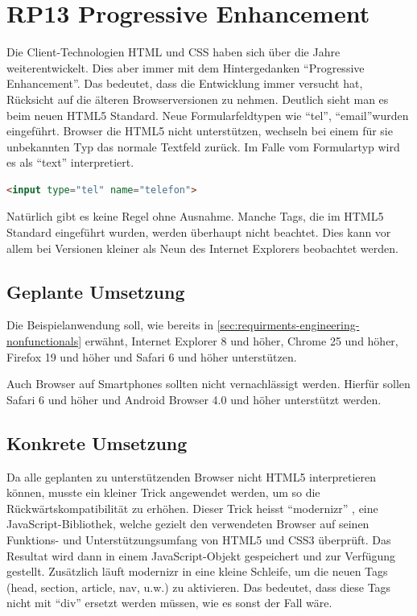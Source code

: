 \section{RP13 Progressive Enhancement}
\label{sec:principle-rp13-progressive-enhancement}

Die Client-Technologien HTML und CSS haben sich über die Jahre weiterentwickelt. Dies aber immer mit dem Hintergedanken ``Progressive Enhancement''. Das bedeutet, dass die Entwicklung immer versucht hat, Rücksicht auf die älteren Browserversionen zu nehmen.
Deutlich sieht man es beim neuen HTML5 Standard. Neue Formularfeldtypen wie ``tel'', ``email''wurden eingeführt. Browser die HTML5 nicht unterstützen, wechseln bei einem für sie unbekannten Typ das normale Textfeld zurück. Im Falle vom Formulartyp wird es als ``text'' interpretiert.

\begin{lstlisting}[language=HTML, caption={Formularfeld mit HTML5, welches eine Telefonnummer erwartet}, label={lst:html5TelInput}]
<input type="tel" name="telefon">
\end{lstlisting}

Natürlich gibt es keine Regel ohne Ausnahme. Manche Tags, die im HTML5 Standard eingeführt wurden, werden überhaupt nicht beachtet. Dies kann vor allem bei Versionen kleiner als Neun des Internet Explorers beobachtet werden.

\subsection*{Geplante Umsetzung}
Die Beispielanwendung soll, wie bereits in \ref{sec:requirments-engineering-nonfunctionals} erwähnt, Internet Explorer 8 und höher, Chrome 25 und höher, Firefox 19 und höher und Safari 6 und höher unterstützen.

Auch Browser auf Smartphones sollten nicht vernachlässigt werden. Hierfür sollen Safari 6 und höher und Android Browser 4.0 und höher unterstützt werden.

\subsection*{Konkrete Umsetzung}
Da alle geplanten zu unterstützenden Browser nicht HTML5 interpretieren können, musste ein kleiner Trick angewendet werden, um so die Rückwärtskompatibilität zu erhöhen. Dieser Trick heisst ``modernizr'' \cite{modernizr}, eine JavaScript-Bibliothek, welche gezielt den verwendeten Browser auf seinen Funktions- und Unterstützungsumfang von HTML5 und CSS3 überprüft. Das Resultat wird dann in einem JavaScript-Objekt gespeichert und zur Verfügung gestellt.  Zusätzlich läuft modernizr in eine kleine Schleife, um die neuen Tags (head, section, article, nav, u.w.) zu aktivieren. Das bedeutet, dass diese Tags nicht mit ``div'' ersetzt werden müssen, wie es sonst der Fall wäre.

